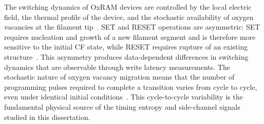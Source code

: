 The switching dynamics of OxRAM devices are controlled by the local
electric field, the thermal profile of the device, and the stochastic
availability of oxygen vacancies at the filament
tip~\cite{yu2012switching}. SET and RESET operations are asymmetric: SET
requires nucleation and growth of a new filament segment and is
therefore more sensitive to the initial CF state, while RESET requires
rupture of an existing structure~\cite{yu2012switching, wei2008highly}.
This asymmetry produces data-dependent differences in switching dynamics
that are observable through write latency measurements. The stochastic
nature of oxygen vacancy migration means that the number of programming
pulses required to complete a transition varies from cycle to cycle,
even under identical initial conditions~\cite{fantini2013intrinsic,
	ambrogio2013understanding}. This cycle-to-cycle variability is the
fundamental physical source of the timing entropy and side-channel
signals studied in this dissertation.